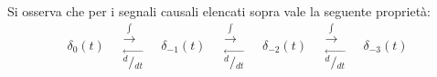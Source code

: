 \documentclass[a4paper]{article}
\begin{document}
Si osserva che per i segnali causali elencati sopra vale la seguente proprietà:
\[\delta_0(t) \quad \begin{array}{c} \stackrel{\int}{\longrightarrow} \\ \stackrel{\longleftarrow}{^d\!/\!_{dt}} \end{array} \quad
\delta_{-1}(t) \quad \begin{array}{c} \stackrel{\int}{\longrightarrow} \\ \stackrel{\longleftarrow}{^d\!/\!_{dt}} \end{array} \quad
\delta_{-2}(t) \quad \begin{array}{c} \stackrel{\int}{\longrightarrow} \\ \stackrel{\longleftarrow}{^d\!/\!_{dt}} \end{array} \quad
\delta_{-3}(t)\]
\end{document}
